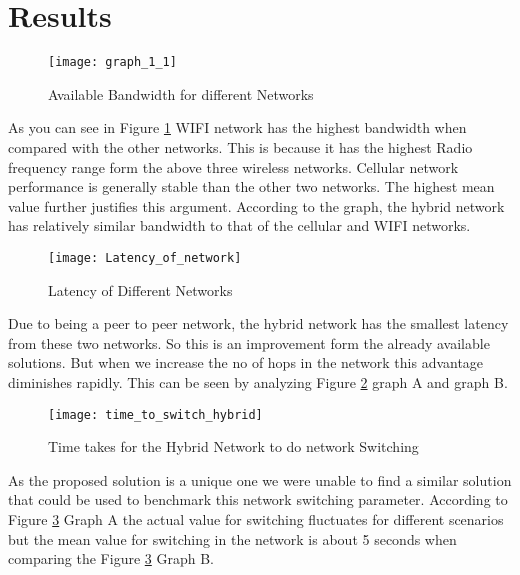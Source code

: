 \section{Results}


\begin{figure}[H]
    \centering
    \texttt{[image: graph\_1\_1]}
    \caption{Available Bandwidth for different Networks }
    \label{fig:pca_coeff_fsf_gujnmk_z}
\end{figure}
\vspace{12pt}

As you can see in Figure \ref{fig:pca_coeff_fsf_gujnmk_z} WIFI network has the highest bandwidth when compared with the other networks. This is because it has the highest Radio frequency range form the above three wireless networks. Cellular network performance is generally stable than the other two networks. The highest mean value further justifies this argument. According to the graph, the hybrid network has relatively similar bandwidth to that of the cellular and WIFI networks.



\begin{figure}[H]
    \centering
    \texttt{[image: Latency\_of\_network]}
    \caption{Latency of Different Networks }
    \label{fig:pca_coeff_gfkfkkf_dkskk_sksksk_KKK_z}
\end{figure}
\vspace{12pt}

Due to being a peer to peer network, the hybrid network has the smallest latency from these two networks. So this is an improvement form the already available solutions. But when we increase the no of hops in the network this advantage diminishes rapidly. This can be seen by analyzing Figure \ref{fig:pca_coeff_gfkfkkf_dkskk_sksksk_KKK_z} graph A and graph B.

\begin{figure}[H]
    \centering
    \texttt{[image: time\_to\_switch\_hybrid]}
    \caption{Time takes for the Hybrid Network to do network Switching }
    \label{fig:pca_coeffdkgkdg_fmnkmnfg_kkfkf_fnfn_z}
\end{figure}
\vspace{12pt}
As the proposed solution is a unique one we were unable to find a similar solution that could be used to benchmark this network switching parameter. According to Figure \ref{fig:pca_coeffdkgkdg_fmnkmnfg_kkfkf_fnfn_z} Graph A  the actual value for switching fluctuates for different scenarios but the  mean value for switching in the network is about 5 seconds when comparing the  Figure \ref{fig:pca_coeffdkgkdg_fmnkmnfg_kkfkf_fnfn_z} Graph B.


